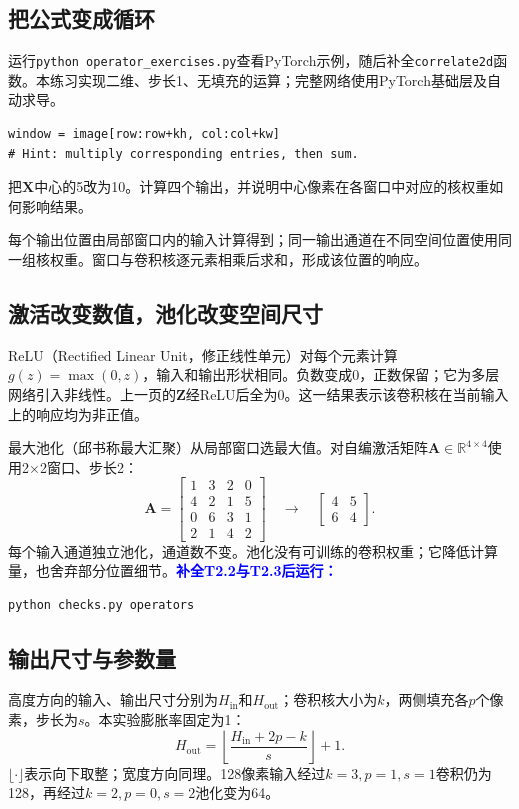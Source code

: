 \documentclass[UTF8,a4paper,11pt,fontset=fandol]{ctexart}
\newcommand{\task}[1]{\textcolor{Blue}{\textbf{#1}}}
\begin{document}
\subsection{把公式变成循环}
运行\texttt{python operator\_exercises.py}查看PyTorch示例，随后补全\texttt{correlate2d}函数。本练习实现二维、步长1、无填充的运算；完整网络使用PyTorch基础层及自动求导。
\begin{lstlisting}
window = image[row:row+kh, col:col+kw]
# Hint: multiply corresponding entries, then sum.
\end{lstlisting}
\begin{questionbox}[修改一个值]
把$\mathbf X$中心的5改为10。计算四个输出，并说明中心像素在各窗口中对应的核权重如何影响结果。
\end{questionbox}
\begin{keybox}[局部连接与权重共享]
每个输出位置由局部窗口内的输入计算得到；同一输出通道在不同空间位置使用同一组核权重。窗口与卷积核逐元素相乘后求和，形成该位置的响应。
\end{keybox}
\clearpage

\subsection{激活改变数值，池化改变空间尺寸}
ReLU（Rectified Linear Unit，修正线性单元）对每个元素计算$g(z)=\max(0,z)$，输入和输出形状相同。负数变成0，正数保留；它为多层网络引入非线性。上一页的$\mathbf Z$经ReLU后全为0。这一结果表示该卷积核在当前输入上的响应均为非正值。

最大池化（邱书称最大汇聚）从局部窗口选最大值。对自编激活矩阵$\mathbf A\in\mathbb R^{4\times4}$使用2$\times$2窗口、步长2：
\begin{equation}
\mathbf A=\begin{bmatrix}1&3&2&0\\4&2&1&5\\0&6&3&1\\2&1&4&2\end{bmatrix}
\quad\longrightarrow\quad
\begin{bmatrix}4&5\\6&4\end{bmatrix}.
\end{equation}
每个输入通道独立池化，通道数不变。池化没有可训练的卷积权重；它降低计算量，也舍弃部分位置细节。\task{补全T2.2与T2.3后运行：}
\begin{lstlisting}[language=bash]
python checks.py operators
\end{lstlisting}
\subsection{输出尺寸与参数量}
高度方向的输入、输出尺寸分别为$H_{\mathrm{in}}$和$H_{\mathrm{out}}$；卷积核大小为$k$，两侧填充各$p$个像素，步长为$s$。本实验膨胀率固定为1：
\begin{equation}
H_{\mathrm{out}}=\left\lfloor\frac{H_{\mathrm{in}}+2p-k}{s}\right\rfloor+1.
\end{equation}
$\lfloor\cdot\rfloor$表示向下取整；宽度方向同理。128像素输入经过$k=3,p=1,s=1$卷积仍为128，再经过$k=2,p=0,s=2$池化变为64。
\end{document}
